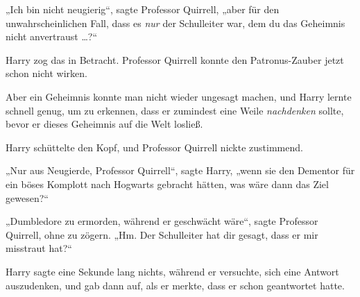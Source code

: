 „Ich bin nicht neugierig“, sagte Professor Quirrell, „aber für den unwahrscheinlichen Fall, dass es \emph{nur} der Schulleiter war, dem du das Geheimnis nicht anvertraust …?“

Harry zog das in Betracht. Professor Quirrell konnte den Patronus-Zauber jetzt schon nicht wirken.

Aber ein Geheimnis konnte man nicht wieder ungesagt machen, und Harry lernte schnell genug, um zu erkennen, dass er zumindest eine Weile \emph{nachdenken} sollte, bevor er dieses Geheimnis auf die Welt losließ.

Harry schüttelte den Kopf, und Professor Quirrell nickte zustimmend.

„Nur aus Neugierde, Professor Quirrell“, sagte Harry, „wenn sie den Dementor für ein böses Komplott nach Hogwarts gebracht hätten, was wäre dann das Ziel gewesen?“

„Dumbledore zu ermorden, während er geschwächt wäre“, sagte Professor Quirrell, ohne zu zögern.
„Hm. Der Schulleiter hat dir gesagt, dass er mir misstraut hat?“

Harry sagte eine Sekunde lang nichts, während er versuchte, sich eine Antwort auszudenken, und gab dann auf, als er merkte, dass er schon geantwortet hatte.

